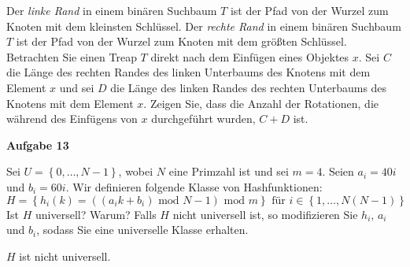 \documentclass{article}
\begin{document}
Der {\it linke Rand} in einem bin{\"a}ren Suchbaum $T$ ist der Pfad von der Wurzel
zum Knoten mit dem kleinsten Schl{\"u}ssel. Der {\it rechte Rand} in einem
bin{\"a}ren Suchbaum $T$ ist der Pfad von der Wurzel zum Knoten mit dem
gr{\"o}{\ss}ten Schl{\"u}ssel. Betrachten Sie einen Treap $T$ direkt nach dem
Einf{\"u}gen eines Objektes $x$. Sei $C$ die L{\"a}nge des rechten Randes des
linken Unterbaums des Knotens mit dem Element $x$ und sei $D$ die L{\"a}nge des
linken Randes des rechten Unterbaums des Knotens mit dem Element $x$. Zeigen Sie,
dass die Anzahl der Rotationen, die w{\"a}hrend des Einf{\"u}gens von $x$
durchgef{\"u}hrt wurden, $C + D$ ist.

\medskip%

{\bfseries Aufgabe 13}%

Sei $U = \left\{ 0, \ldots, N - 1 \right\}$, wobei $N$ eine Primzahl ist und sei
$m = 4$. Seien $a_i = 40i$ und $b_i = 60i$. Wir definieren folgende Klasse von
Hashfunktionen:
\begin{equation}
  H = \left\{ h_i \left( k \right) = \left( \left( a_ik + b_i \right)\text{ mod }N - 1 \right)\text{ mod }m \right\}
  \text{ f{\"u}r } i \in \left\{ 1, \ldots, N \left( N - 1 \right) \right\}
\end{equation}
Ist $H$ universell? Warum? Falls $H$ nicht universell ist, so modifizieren Sie
$h_i$, $a_i$ und $b_i$, sodass Sie eine universelle Klasse erhalten.

\medskip%

$H$ ist nicht universell.
\end{document}
